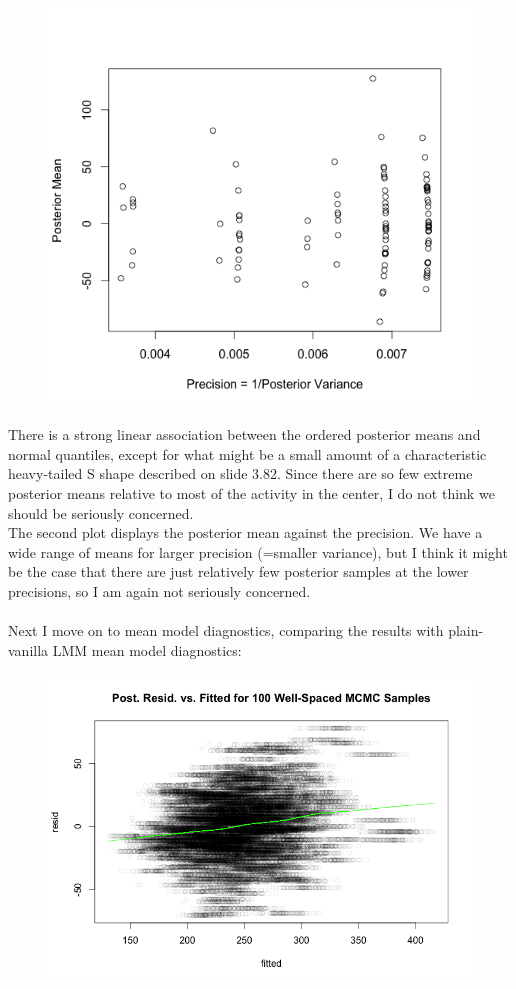 \documentclass[11pt]{article}
\begin{document}
\begin{enumerate}
\begin{enumerate}
\begin{figure}[H]
		\includegraphics[scale=0.4]{Rplotp2b2}
	\end{figure}
	There is a strong linear association between the ordered posterior means and normal quantiles, except for what might be a small amount of a characteristic heavy-tailed S shape described on slide 3.82. Since there are so few extreme posterior means relative to most of the activity in the center, I do not think we should be seriously concerned.
	\\  The second plot displays the posterior mean against the precision. We have a wide range of means for larger precision (=smaller variance), but I think it might be the case that there are just relatively few posterior samples at the lower precisions, so I am again not seriously concerned. \\ \\ 
	Next I move on to mean model diagnostics, comparing the results with plain-vanilla LMM mean model diagnostics:
	\begin{figure}[H]
		\includegraphics[scale=0.4]{Rplotp2b3}

\end{figure}
\end{enumerate}
\end{enumerate}
\end{document}
